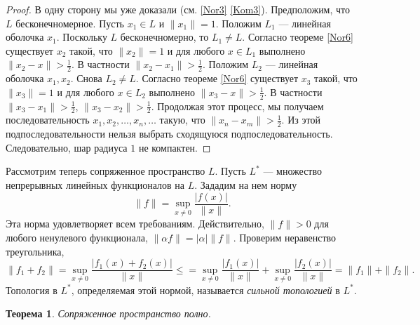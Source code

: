 \documentclass[12pt, titlepage, oneside]{amsbook}
\newtheorem{theorem}{Теорема}[chapter]
\theoremstyle{definition}
\theoremstyle{remark}
\begin{document}
\begin{proof}
	В одну сторону мы уже доказали (см. \ref{Nor3} \ref{Kom3}). Предположим, что $L$ бесконечномерное. Пусть $x_1\in L$ и $\|x_1\|=1$. Положим $L_1$ --- линейная оболочка $x_1$. Поскольку $L$ бесконечномерно, то $L_1\neq L$. Согласно теореме \ref{Nor6} существует $x_2$ такой, что $\|x_2\|=1$ и для любого $x\in L_1$ выполнено $\|x_2-x\|>\frac{1}{2}$. В частности $\|x_2-x_1\|>\frac{1}{2}$. Положим $L_2$ --- линейная оболочка $x_1,x_2$. Снова $L_2\neq L$. Согласно теореме \ref{Nor6} существует $x_3$ такой, что $\|x_3\|=1$ и для любого $x\in L_2$ выполнено $\|x_3-x\|>\frac{1}{2}$. В частности $\|x_3-x_1\|>\frac{1}{2}$, $\|x_3-x_2\|>\frac{1}{2}$. Продолжая этот процесс, мы получаем последовательность $x_1,x_2,\ldots, x_n,\ldots$ такую, что $\|x_n-x_m\|>\frac{1}{2}$. Из этой подпоследовательности нельзя выбрать сходящуюся подпоследовательность. Следовательно, шар радиуса $1$ не компактен.
\end{proof}

Рассмотрим теперь сопряженное пространство $L$. Пусть $L^*$ --- множество непрерывных линейных функционалов на $L$. Зададим на нем норму $$\|f\|=\sup\limits_{x\neq 0}\frac{|f(x)|}{\|x\|}.$$ Эта норма удовлетворяет всем требованиям. Действительно, $\|f\|>0$ для любого ненулевого функционала, $\|\alpha f\|=|\alpha| \|f\|$. Проверим неравенство треугольника, $$\|f_1+f_2\|=\sup\limits_{x\neq 0}\frac{|f_1(x)+f_2(x)|}{\|x\|}\leq=\sup\limits_{x\neq 0}\frac{|f_1(x)|}{\|x\|}+\sup\limits_{x\neq 0}\frac{|f_2(x)|}{\|x\|}=\|f_1\|+\|f_2\|.$$ Топология в $L^*$, определяемая этой нормой, называется \emph{сильной топологией} в $L^*$.

\begin{theorem}
	\label{Nor8}
	Сопряженное пространство полно.
\end{theorem}
\end{document}
